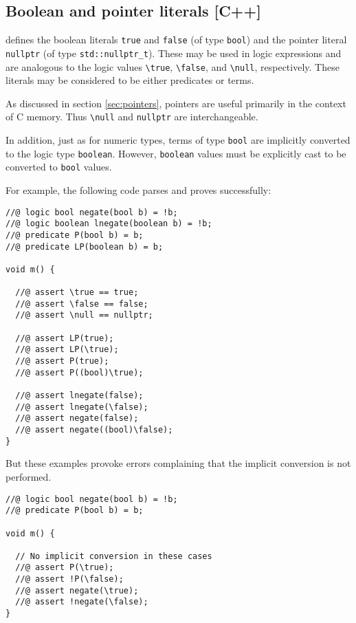 \subsection{Boolean and pointer literals [C++]}

\lang{} defines the boolean literals
\lstinline|true| and \lstinline|false| (of type \lstinline|bool|) and the pointer literal \lstinline|nullptr| (of type \lstinline|std::nullptr_t|). 
These may be used in logic expressions and are analogous to the logic values \lstinline|\true|, 
\lstinline|\false|, and \lstinline|\null|, respectively. 
These literals may be considered
to be either predicates or terms.

As discussed in section \ref{sec:pointers}, pointers are useful primarily in
the context of C memory. Thus \lstinline|\null| and \lstinline|nullptr|
are interchangeable.

In addition, just as for numeric types, terms of type \lstinline|bool| are
implicitly converted to the logic type \lstinline|boolean|.
However, \lstinline|boolean| values must be explicitly cast to be
converted to \lstinline|bool| values.

For example, the following code parses and proves successfully:
\begin{lstlisting}
//@ logic bool negate(bool b) = !b;
//@ logic boolean lnegate(boolean b) = !b;
//@ predicate P(bool b) = b;
//@ predicate LP(boolean b) = b;

void m() {

  //@ assert \true == true;
  //@ assert \false == false;
  //@ assert \null == nullptr;

  //@ assert LP(true);
  //@ assert LP(\true);
  //@ assert P(true);
  //@ assert P((bool)\true);

  //@ assert lnegate(false);
  //@ assert lnegate(\false);
  //@ assert negate(false);
  //@ assert negate((bool)\false);
}
\end{lstlisting}

But these examples provoke errors complaining that the implicit conversion
is not performed.
\begin{lstlisting}
//@ logic bool negate(bool b) = !b;
//@ predicate P(bool b) = b;

void m() {

  // No implicit conversion in these cases
  //@ assert P(\true);
  //@ assert !P(\false);
  //@ assert negate(\true);
  //@ assert !negate(\false);
}
\end{lstlisting}